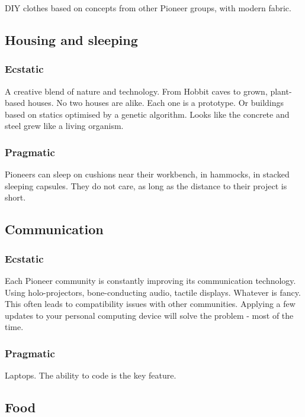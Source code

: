 DIY clothes based on concepts from other Pioneer groups, with modern fabric.

\subsection{Housing and sleeping}


\subsubsection{Ecstatic}

A creative blend of nature and technology. From Hobbit caves to grown, plant-based houses. No two houses are alike. Each one is a prototype.
Or buildings based on statics optimised by a genetic algorithm. Looks like the concrete and steel grew like a living organism.

\subsubsection{Pragmatic}

Pioneers can sleep on cushions near their workbench, in hammocks, in stacked sleeping capsules. They do not care, as long as the distance to their project is short.

\subsection{Communication}


\subsubsection{Ecstatic}

Each Pioneer community is constantly improving its communication technology. Using holo-projectors, bone-conducting audio, tactile displays. Whatever is fancy.
This often leads to compatibility issues with other communities. Applying a few updates to your personal computing device will solve the problem - most of the time.

\subsubsection{Pragmatic}

Laptops. The ability to code is the key feature.

\subsection{Food}
\label{sec: pioneer food}

